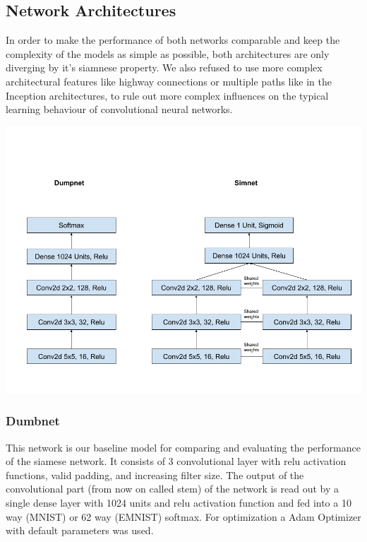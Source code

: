 \documentclass[a4paper,pt12]{article}
\begin{document}
\subsection{Network Architectures}
In order to make the performance of both networks comparable and keep the complexity of the models as simple as possible, both architectures are only diverging by it's siamnese property. We also refused to use more complex architectural features like highway connections or multiple paths like in the Inception architectures, to rule out more complex influences on the typical learning behaviour of convolutional neural networks.

\includegraphics[scale=0.3]{nets.png}

\subsubsection{Dumbnet}
This network is our baseline model for comparing and evaluating the performance of the siamese network.  It consists of 3 convolutional layer with relu activation functions, valid padding, and increasing filter size. \newline
The output of the convolutional part (from now on called stem) of the network is read out by a single dense layer with 1024 units and relu activation function and fed into a 10 way (MNIST) or 62 way (EMNIST) softmax. For optimization a Adam Optimizer with default parameters was used.
\end{document}
